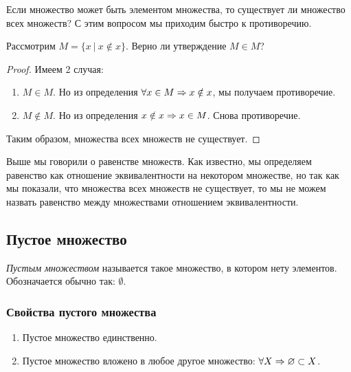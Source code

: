 Если множество может быть элементом множества, то существует ли множество всех множеств? С этим вопросом мы приходим быстро к противоречию.
 
\begin{proposition}
    Рассмотрим $M = \{x\ |\ x \notin x\}$. Верно ли утверждение $M \in M$?
\end{proposition}
 
\begin{proof}
    Имеем 2 случая:
    
    \begin{enumerate}
        \item $M \in M$. Но из определения $\forall x \in M \Rightarrow x \notin x$, мы получаем противоречие.
        \item $M \notin M$. Но из определения $x \notin x \Rightarrow x \in M$. Снова противоречие.
    \end{enumerate}
    
    Таким образом, множества всех множеств не существует.
\end{proof}
 
\begin{note}
    Выше мы говорили о равенстве множеств. Как известно, мы определяем равенство как отношение эквивалентности на некотором множестве, но так как мы показали, что множества всех множеств не существует, то мы не можем назвать равенство между множествами отношением эквивалентности.
\end{note}
 
\subsection{Пустое множество}
 
\begin{definition}
    \textit{Пустым множеством} называется такое множество, в котором нету элементов. Обозначается обычно так: $\emptyset$.
\end{definition}
 
\subsubsection*{Свойства пустого множества}
 
\begin{enumerate}
     \item Пустое множество единственно.
     \item Пустое множество вложено в любое другое множество: $\forall X \Rightarrow \varnothing \subset X$.
\end{enumerate}
 
